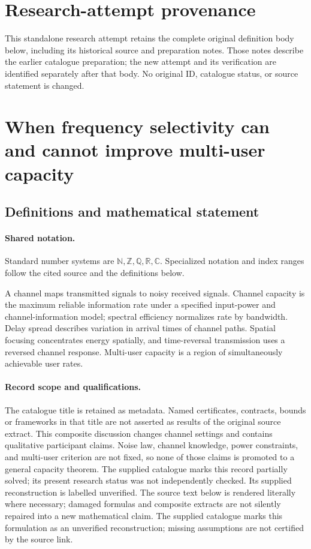 \documentclass[11pt]{article}
\begin{document}
\section*{Research-attempt provenance}
This standalone research attempt retains the complete original definition body below,
including its historical source and preparation notes. Those notes describe the
earlier catalogue preparation; the new attempt and its verification are identified
separately after that body. No original ID, catalogue status, or source statement is changed.

\section{When frequency selectivity can and cannot improve multi-user capacity}\label{statement}

\subsection{Definitions and mathematical statement}

\paragraph{Shared notation.}Standard number systems are $\mathbb N,\mathbb Z,\mathbb Q,\mathbb R,\mathbb C$. Specialized notation and index ranges follow the cited source and the definitions below.


A channel maps transmitted signals to noisy received signals. Channel capacity is the maximum reliable information rate under a specified input-power and channel-information model; spectral efficiency normalizes rate by bandwidth. Delay spread describes variation in arrival times of channel paths. Spatial focusing concentrates energy spatially, and time-reversal transmission uses a reversed channel response. Multi-user capacity is a region of simultaneously achievable user rates.
\paragraph{Record scope and qualifications.}
The catalogue title is retained as metadata. Named certificates, contracts, bounds or frameworks in that title are not asserted as results of the original source extract.
This composite discussion changes channel settings and contains qualitative participant claims. Noise law, channel knowledge, power constraints, and multi-user criterion are not fixed, so none of those claims is promoted to a general capacity theorem. The supplied catalogue marks this record partially solved; its present research status was not independently checked. Its supplied reconstruction is labelled unverified.
The source text below is rendered literally where necessary; damaged formulas and composite extracts are not silently repaired into a new mathematical claim.
The supplied catalogue marks this formulation as an unverified reconstruction; missing assumptions are not certified by the source link.
\end{document}
